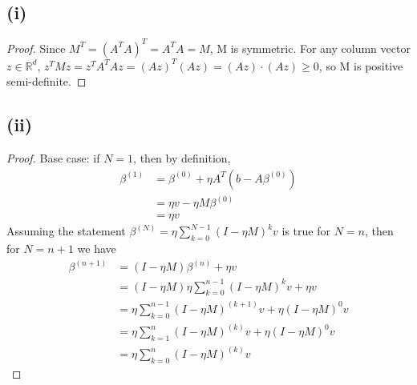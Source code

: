 \documentclass[twoside,11pt]{homework}
\begin{document}
\subsection*{(i)}
	\begin{proof}
		Since $M^{T} = (A^{T}A)^{T} = A^{T}A = M$, M is symmetric. 
		For any column vector $z\in \mathbb{R}^d$, $z^TMz = z^TA^TAz = (Az)^T (Az) = (Az)\cdot(Az) \geq 0$, 
		so M is positive semi-definite.
	\end{proof}
\subsection*{(ii)}
	\begin{proof}
		Base case: if $N=1$, then by definition, 
		\begin{align*}
			\beta^{(1)} &= \beta^{(0)}+ \eta  A^{T} (b-A \beta^{(0)}) \\
			&= \eta v - \eta M \beta^{(0)} \\
			&= \eta v 
		\end{align*}
		Assuming the statement $\beta^{(N)} = \eta \sum_{k=0}^{N-1} (I-\eta M)^k v$ is true for $N=n$, then for $N=n+1$ we have
		\begin{align*}
			\beta^{(n+1)} &= (I-\eta M) \beta^{(n)} + \eta v \tag{definition} \\
			&= (I-\eta M) \eta  \sum_{k=0}^{n-1} (I-\eta M)^k v + \eta v \tag{induction hypothesis} \\
			&= \eta  \sum_{k=0}^{n-1} (I-\eta M)^{(k+1)} v + \eta (I-\eta M)^0 v \\
			&= \eta  \sum_{k=1}^{n} (I-\eta M)^{(k)} v + \eta (I-\eta M)^0 v \\
			&= \eta  \sum_{k=0}^{n} (I-\eta M)^{(k)} v
		\end{align*}
	\end{proof}
\end{document}
